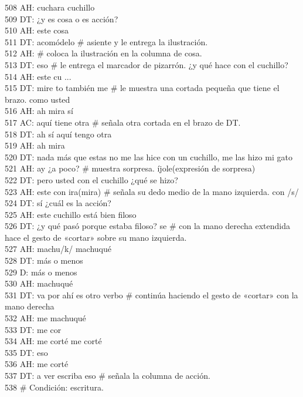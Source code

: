 508 AH: cuchara cuchillo\\
509 DT: ¿y es cosa o es acción?\\
510 AH: este cosa\\
511 DT: acomódelo \# asiente y le entrega la ilustración.\\
512 AH: # coloca la ilustración en la columna de cosa.\\
513 DT: eso \# le entrega el marcador de pizarrón. ¿y qué hace con el cuchillo?\\
514 AH: este cu ...\\
515 DT: mire to también me # le muestra una cortada pequeña que tiene el brazo. como usted\\
516 AH: ah mira sí\\
517 AC: aquí tiene otra \# señala otra cortada en el brazo de DT.\\
518 DT: ah sí aquí tengo otra\\
519 AH: ah mira\\
520 DT: nada más que estas no me las hice con un cuchillo, me las hizo mi gato\\
521 AH: ay ¿a poco? \# muestra sorpresa. íjole(expresión de sorpresa)\\
522 DT: pero usted con el cuchillo ¿qué se hizo?\\
523 AH: este con ira(mira) \# señala su dedo medio de la mano izquierda. con /s/\\
524 DT: sí ¿cuál es la acción?\\
525 AH: este cuchillo está bien filoso\\
526 DT: ¿y qué pasó porque estaba filoso? se \# con la mano derecha extendida hace el gesto de «cortar» sobre su mano izquierda.\\
527 AH: machu/k/ machuqué\\
528 DT: más o menos\\
529 D: más o menos\\
530 AH: machuqué\\
531 DT: va por ahí es otro verbo \# continúa haciendo el gesto de «cortar» con la mano derecha\\
532 AH: me machuqué\\
533 DT: me cor\\
534 AH: me corté me corté\\
535 DT: eso\\
536 AH: me corté\\
537 DT: a ver escriba eso \# señala la columna de acción.\\
538 # Condición: escritura.\\
